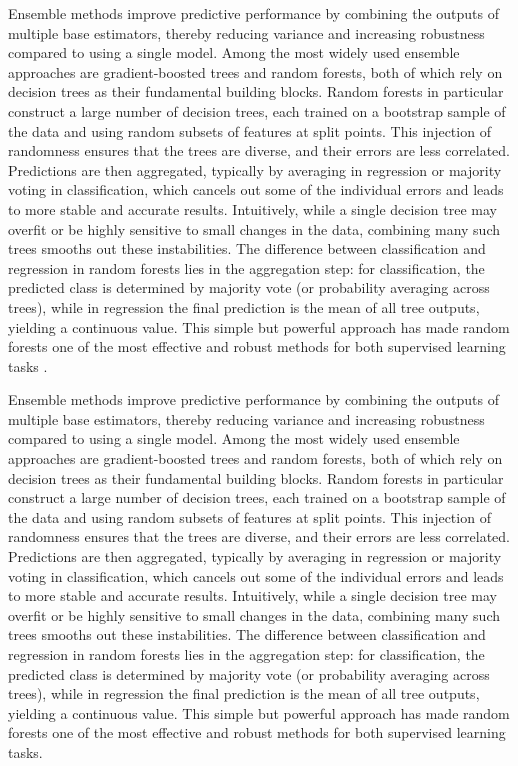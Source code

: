 Ensemble methods improve predictive performance by combining the outputs of multiple base estimators, thereby reducing variance and increasing robustness compared to using a single model. Among the most widely used ensemble approaches are gradient-boosted trees and random forests, both of which rely on decision trees as their fundamental building blocks. Random forests in particular construct a large number of decision trees, each trained on a bootstrap sample of the data and using random subsets of features at split points. This injection of randomness ensures that the trees are diverse, and their errors are less correlated. Predictions are then aggregated, typically by averaging in regression or majority voting in classification, which cancels out some of the individual errors and leads to more stable and accurate results. Intuitively, while a single decision tree may overfit or be highly sensitive to small changes in the data, combining many such trees smooths out these instabilities. The difference between classification and regression in random forests lies in the aggregation step: for classification, the predicted class is determined by majority vote (or probability averaging across trees), while in regression the final prediction is the mean of all tree outputs, yielding a continuous value. This simple but powerful approach has made random forests one of the most effective and robust methods for both supervised learning tasks \cite{Breiman2001RandomF}.

Ensemble methods improve predictive performance by combining the outputs of multiple base estimators, thereby reducing variance and increasing robustness compared to using a single model. Among the most widely used ensemble approaches are gradient-boosted trees and random forests, both of which rely on decision trees as their fundamental building blocks. Random forests in particular construct a large number of decision trees, each trained on a bootstrap sample of the data and using random subsets of features at split points. This injection of randomness ensures that the trees are diverse, and their errors are less correlated. Predictions are then aggregated, typically by averaging in regression or majority voting in classification, which cancels out some of the individual errors and leads to more stable and accurate results. Intuitively, while a single decision tree may overfit or be highly sensitive to small changes in the data, combining many such trees smooths out these instabilities. The difference between classification and regression in random forests lies in the aggregation step: for classification, the predicted class is determined by majority vote (or probability averaging across trees), while in regression the final prediction is the mean of all tree outputs, yielding a continuous value. This simple but powerful approach has made random forests one of the most effective and robust methods for both supervised learning tasks.


